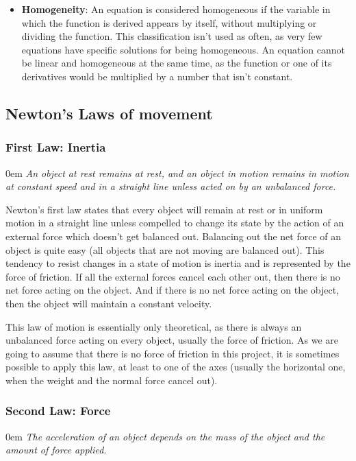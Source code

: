 \documentclass[12pt,twoside,a4paper]{article}
\renewcommand{\quote}[1]{\og#1\fg{}}
\begin{document}
\begin{itemize}
		\item \textbf{Homogeneity}: An equation is considered homogeneous if the variable in which the function is derived appears by itself, without multiplying or dividing the function. This classification isn't used as often, as very few equations have specific solutions for being homogeneous. An equation cannot be linear and homogeneous at the same time, as the function or one of its derivatives would be multiplied by a number that isn't constant.
	\end{itemize}
	
	\cleardoublepage
	
	\subsection*{Newton's Laws of movement}
	\subsubsection*{First Law: Inertia}
	{\parindent0em
		\textit{\quote{An object at rest remains at rest, and an object in motion remains in motion at constant speed and in a straight line unless acted on by an unbalanced force.}}%
	}

	Newton’s first law states that every object will remain at rest or in uniform motion in a straight line unless compelled to change its state by the action of an external force which doesn't get balanced out. Balancing out the net force of an object is quite easy (all objects that are not moving are balanced out). This tendency to resist changes in a state of motion is inertia and is represented by the force of friction. If all the external forces cancel each other out, then there is no net force acting on the object. And if there is no net force acting on the object, then the object will maintain a constant velocity. \cite{NASA-NewtonLawsOfMotion}
	
	This law of motion is essentially only theoretical, as there is always an unbalanced force acting on every object, usually the force of friction. As we are going to assume that there is no force of friction in this project, it is sometimes possible to apply this law, at least to one of the axes (usually the horizontal one, when the weight and the normal force cancel out).
	
	\subsubsection*{Second Law: Force}
	{\parindent0em
		\textit{\quote{The acceleration of an object depends on the mass of the object and the amount of force applied.}}%
	}
\end{document}
